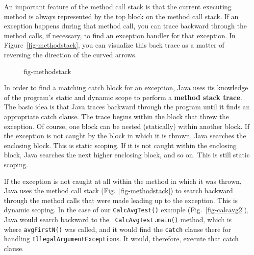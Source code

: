 An important feature of the method call stack is that the current
executing method 
is always represented by the top block on the method call
stack.   If an exception happens during that method call, you can trace
backward through the method calls, if necessary, to find an
exception handler for that exception.  In Figure~\ref{fig-methodstack},
you can visualize this back trace as a matter of reversing the
direction of the curved arrows.

\begin{figure}[tb]
 {fig-methodstack}

\end{figure}

In order to find a matching catch block for an exception, Java 
uses its knowledge of the program's static and dynamic scope to
perform a {\bf method stack trace}.  The basic idea is that Java
traces backward through the program until it finds an appropriate
catch clause.  The trace begins within the block that threw the
exception.  Of course, one block can be nested (statically) within
another block.  If the exception is not caught by the block in which
it is thrown, Java searches the enclosing block.  This is static
scoping.  If it is not caught within the enclosing block, Java
searches the next higher enclosing block, and so on.  This is still
static scoping.

If the exception is not caught at all within the method in which it
was thrown, Java uses the method call stack
(Fig.~\ref{fig-methodstack}) to search backward through the method
calls that were made leading up to the exception.  This is dynamic
scoping.  In the case of our {\tt CalcAvgTest()} example
(Fig.~\ref{fig-calcavg2}), Java would search backward to the {\tt
CalcAvgTest.main()} method, which is where {\tt avgFirstN()} was
called, and it would find the {\tt catch} clause there for handling
{\tt IllegalArgumentException}s.  It would, therefore, execute that catch
clause.


